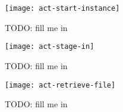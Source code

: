 \begin{figure}
  \begin{center}
    \texttt{[image: act-start-instance]}
  \end{center}
  \caption[Start Instance Activity]{TODO: fill me in}
  \label{fig:act-start-instance}
\end{figure}

\begin{figure}
  \begin{center}
    \texttt{[image: act-stage-in]}
  \end{center}
  \caption[Stage-In Activity]{TODO: fill me in}
  \label{fig:act-stage-in}
\end{figure}

\begin{figure}
  \begin{center}
    \texttt{[image: act-retrieve-file]}
  \end{center}
  \caption[File Retrieval Activity]{TODO: fill me in}
  \label{fig:act-retrieve-file}
\end{figure}


